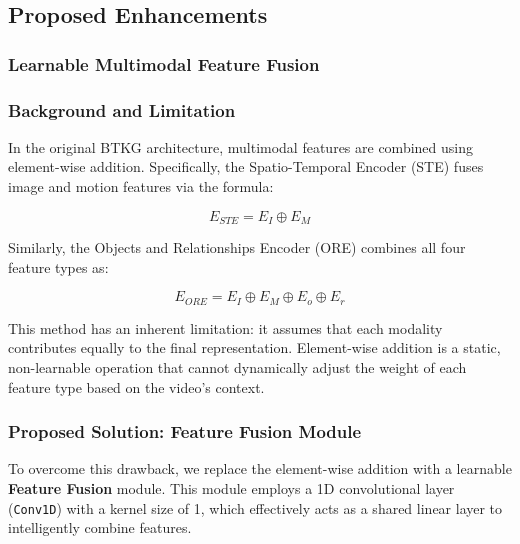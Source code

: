 \subsection{Proposed Enhancements}

\subsubsection{Learnable Multimodal Feature Fusion}

\subsubsection*{Background and Limitation}

In the original BTKG architecture, multimodal features are combined using element-wise addition. Specifically, the Spatio-Temporal Encoder (STE) fuses image and motion features via the formula:

$$E_{STE} = E_I \oplus E_M$$

Similarly, the Objects and Relationships Encoder (ORE) combines all four feature types as:

$$E_{ORE} = E_I \oplus E_M \oplus E_o \oplus E_r$$

This method has an inherent limitation: it assumes that each modality contributes equally to the final representation. Element-wise addition is a static, non-learnable operation that cannot dynamically adjust the weight of each feature type based on the video's context.

\subsubsection*{Proposed Solution: Feature Fusion Module}

To overcome this drawback, we replace the element-wise addition with a learnable \textbf{Feature Fusion} module. This module employs a 1D convolutional layer (\texttt{Conv1D}) with a kernel size of 1, which effectively acts as a shared linear layer to intelligently combine features.

